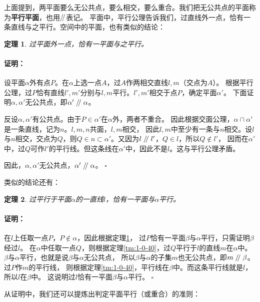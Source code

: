 \documentclass[12pt,UTF8]{ctexbook}
\newtheorem{tm}{定理}[section]
\renewenvironment{proof}{\paragraph{\textbf{证明：}}}{\hfill$\square$}
\renewcommand\parallel{\mathrel{/\mskip-4mu/}}
\begin{document}
上面提到，两平面要么无公共点，要么相交，要么重合。我们把无公共点的平面称为\textbf{平行平面}，也用$\parallel$表记。
平面中，平行公理告诉我们，过直线外一点，恰有一条直线与之平行。空间中的平面，也有类似的结论：
\begin{tm}\label{tm:1-0-50}
    过平面外一点，恰有一平面与之平行。
\end{tm}
\begin{proof}
    设平面$\alpha$外有点$P$。在$\alpha$上选一点$A$，过$A$作两相交直线$l,m$（交点为$A$）。
    根据平行公理，过$P$恰有直线$l', m'$分别与$l,m$平行。$l',m'$相交于点$P$，确定平面$\alpha'$。
    下面证明$\alpha,\alpha'$无公共点，即$\alpha'\parallel\alpha$。

    反设$\alpha,\alpha'$有公共点。由于$P\in\alpha'$在$\alpha$外，两者不重合。
    因此根据交面公理，$\alpha \cap \alpha'$是一条直线，记为$n$。$l,m,n$共面，$l,m$相交，
    因此$l,m$中至少有一条与$n$相交。设$l$与$n$相交，交点为$Q$，则$Q\in n\subset\alpha'$。又因为$l\parallel l'$，$Q\in l$，所以$Q\notin l'$，
    因而在$\alpha'$中，过$Q$可作$l'$的平行线。但这条线在$\alpha'$中，因此不是$l$。这与平行公理矛盾。
        
    因此，$\alpha,\alpha'$无公共点，$\alpha'\parallel\alpha$。
\end{proof}

类似的结论还有：

\begin{tm}\label{tm:1-0-60}
    过平行于平面$\alpha$的一直线$l$，恰有一平面与$\alpha$平行。
\end{tm}
\begin{proof}
在$l$上任取一点$P$，$P\notin \alpha$，因此根据定理\ref{tm:1-0-50}，
过$P$恰有一平面$\beta$与$\alpha$平行，只需证明$\beta$经过$l$。
在$\alpha$中任取一点$Q$，则根据定理\ref{tm:1-0-40}，过$Q$平行于$l$的直线$m$在$\alpha$中。
$\beta$与$\alpha$平行，也就是说$\beta$与$\alpha$无公共点，
所以$\beta$与$\alpha$的子集$m$也无公共点，即$m\parallel \beta$。过$P$作$m$的平行线，
则根据定理\ref{tm:1-0-40}，平行线在$\beta$中。而这条平行线就是$l$，所以$l$在$\beta$中。
这说明过$l$恰有一平面$\beta$与$\alpha$平行。
\end{proof}

从证明中，我们还可以提炼出判定平面平行（或重合）的准则：
\end{document}
